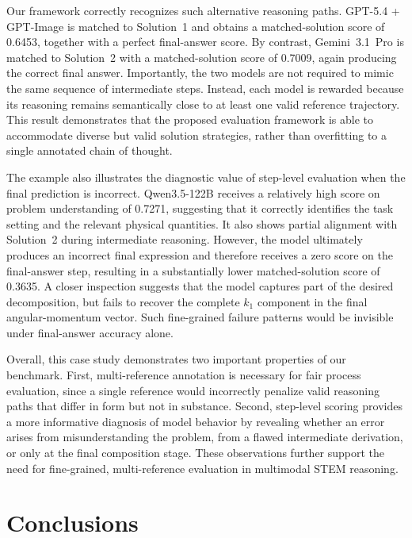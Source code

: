 \documentclass[11pt]{article}
\begin{document}
Our framework correctly recognizes such alternative reasoning paths. GPT-5.4 + GPT-Image is matched to Solution~1 and obtains a matched-solution score of 0.6453, together with a perfect final-answer score. By contrast, Gemini~3.1~Pro is matched to Solution~2 with a matched-solution score of 0.7009, again producing the correct final answer. Importantly, the two models are not required to mimic the same sequence of intermediate steps. Instead, each model is rewarded because its reasoning remains semantically close to at least one valid reference trajectory. This result demonstrates that the proposed evaluation framework is able to accommodate diverse but valid solution strategies, rather than overfitting to a single annotated chain of thought.

The example also illustrates the diagnostic value of step-level evaluation when the final prediction is incorrect. Qwen3.5-122B receives a relatively high score on problem understanding of 0.7271, suggesting that it correctly identifies the task setting and the relevant physical quantities. It also shows partial alignment with Solution~2 during intermediate reasoning. However, the model ultimately produces an incorrect final expression and therefore receives a zero score on the final-answer step, resulting in a substantially lower matched-solution score of 0.3635. A closer inspection suggests that the model captures part of the desired decomposition, but fails to recover the complete $k_1$ component in the final angular-momentum vector. Such fine-grained failure patterns would be invisible under final-answer accuracy alone.

Overall, this case study demonstrates two important properties of our benchmark. First, multi-reference annotation is necessary for fair process evaluation, since a single reference would incorrectly penalize valid reasoning paths that differ in form but not in substance. Second, step-level scoring provides a more informative diagnosis of model behavior by revealing whether an error arises from misunderstanding the problem, from a flawed intermediate derivation, or only at the final composition stage. These observations further support the need for fine-grained, multi-reference evaluation in multimodal STEM reasoning.



\section{Conclusions}
\end{document}
